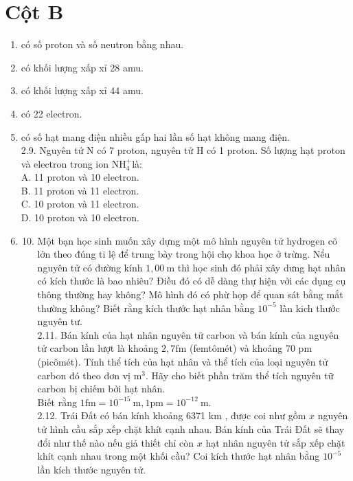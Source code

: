 \documentclass[10pt]{article}
\begin{document}
\section*{Cột B}
\begin{enumerate}
  \item có số proton và số neutron bằng nhau.
  \item có khối lượng xấp xỉ 28 amu.
  \item có khối lượng xấp xỉ 44 amu.
  \item có 22 electron.
  \item có số hạt mang điện nhiều gấp hai lần số hạt không mang điện.\\
2.9. Nguyên tử N có 7 proton, nguyên tử H có 1 proton. Số lượng hạt proton và electron trong ion $\mathrm{NH}_{4}^{+}$là:\\
A. 11 proton và 10 electron.\\
B. 11 proton và 11 electron.\\
C. 10 proton và 11 electron.\\
D. 10 proton và 10 electron.
  \item 
  \begin{enumerate}
    \setcounter{enumii}{9}
    \item Một bạn học sinh muốn xây dựng một mô hình nguyên tử hydrogen cõ lớn theo đúng ti lệ để trung bày trong hội chọ khoa học ở trừng. Nểu nguyên tử có đường kính $1,00 \mathrm{~m}$ thì học sinh đó phải xây dưng hạt nhân có kích thước là bao nhiêu? Điều đó có dễ dàng thự hiện vởi các dụng cụ thông thường hay không? Mô hình đó có phừ họp để quan sát bằng mắt thường không? Biết rằng kích thước hạt nhân bằng $10^{-5}$ là̀n kich thước nguyên tư.\\
2.11. Bán kính của hạt nhân nguyên tữ carbon và bán kính của nguyên tử carbon lần lượt là khoảng $2,7 \mathrm{fm}$ (femtômét) và khoảng 70 pm (picômét). Tính thể tích của hạt nhân và thể tích của loại nguyên tử carbon đó theo đơn vị $\mathrm{m}^{3}$. Hãy cho biết phần trăm thể tích nguyên tữ carbon bị chiếm bởi hạt nhân.\\
Biết rằng $1 \mathrm{fm}=10^{-15} \mathrm{~m}, 1 \mathrm{pm}=10^{-12} \mathrm{~m}$.\\
2.12. Trái Đất có bán kính khoảng 6371 km , được coi như gồm $x$ nguyên tử hình cầu sắp xếp chặt khít cạnh nhau. Bán kính của Trái Đất sẽ thay đổi như thế nào nếu giả thiết chỉ còn $x$ hạt nhân nguyên tử sắp xếp chặt khít cạnh nhau trong một khối cầu? Coi kích thước hạt nhân bằng $10^{-5}$ lần kích thước nguyên tử.\\

\end{enumerate}
\end{enumerate}
\end{document}
